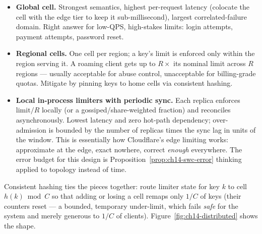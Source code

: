\begin{itemize}
  \item \textbf{Global cell.} Strongest semantics, highest per-request
        latency (colocate the cell with the edge tier to keep it
        sub-millisecond), largest correlated-failure domain. Right answer
        for low-QPS, high-stakes limits: login attempts, payment attempts,
        password reset.
  \item \textbf{Regional cells.} One cell per region; a key's limit is
        enforced only within the region serving it. A roaming client gets up
        to $R \times$ its nominal limit across $R$ regions --- usually
        acceptable for abuse control, unacceptable for billing-grade quotas.
        Mitigate by pinning keys to home cells via consistent hashing.
  \item \textbf{Local in-process limiters with periodic sync.} Each replica
        enforces $\mathrm{limit}/R$ locally (or a gossiped/share-weighted
        fraction) and reconciles asynchronously. Lowest latency and zero
        hot-path dependency; over-admission is bounded by the number of
        replicas times the sync lag in units of the window. This is
        essentially how Cloudflare's edge limiting works: approximate at the
        edge, exact nowhere, correct \emph{enough} everywhere. The error
        budget for this design is Proposition~\ref{prop:ch14-swc-error}
        thinking applied to topology instead of time.
\end{itemize}

Consistent hashing ties the pieces together: route limiter state for key
$k$ to cell $h(k) \bmod C$ so that adding or losing a cell remaps only
$1/C$ of keys (their counters reset --- a bounded, temporary under-limit,
which fails \emph{safe} for the system and merely generous to $1/C$ of
clients). Figure~\ref{fig:ch14-distributed} shows the shape.

